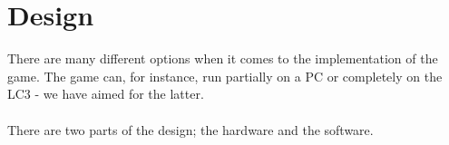 \documentclass{acm_proc_article-sp}
\begin{document}

\section{Design}
There are many different options when it comes to the implementation of the game. The game can, for instance, run partially on a PC or completely on the LC3 - we have aimed for the latter.\\\\
There are two parts of the design; the hardware and the software.
\end{document}
